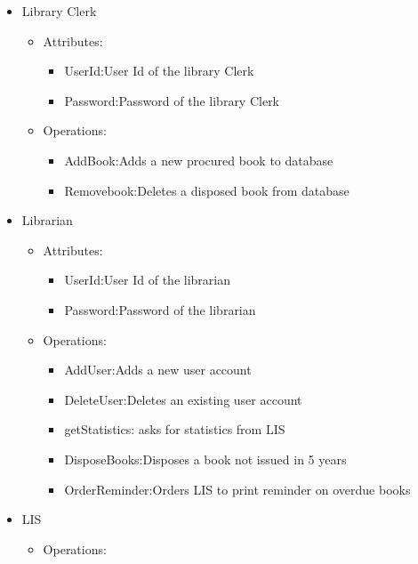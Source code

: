 \documentclass{article}
\begin{document}
\begin{itemize}
\begin{itemize}
\begin{itemize}
\end{itemize}
\end{itemize}

\item Library Clerk
\begin{itemize}
\item Attributes:
\begin{itemize}
\item UserId:User Id of the library Clerk\\
\item Password:Password of the library Clerk\\
\end{itemize}

\item Operations:
\begin{itemize}
\item AddBook:Adds a new procured book to database\\
\item Removebook:Deletes a disposed book from database\\
\end{itemize}
\end{itemize}
\item Librarian

\begin{itemize}

\item Attributes:
\begin{itemize}
\item UserId:User Id of the librarian
\item Password:Password of the librarian
\end{itemize}
\item Operations:
\begin{itemize}
\item AddUser:Adds a new user account
\item DeleteUser:Deletes an existing user account
\item getStatistics: asks for statistics from LIS
\item DisposeBooks:Disposes a book not issued in 5 years
\item OrderReminder:Orders LIS to print reminder on overdue books
\end{itemize}
\end{itemize}

\item LIS
\begin{itemize}
\item Operations:\\
\begin{itemize}


\end{itemize}
\end{itemize}
\end{itemize}
\end{document}
